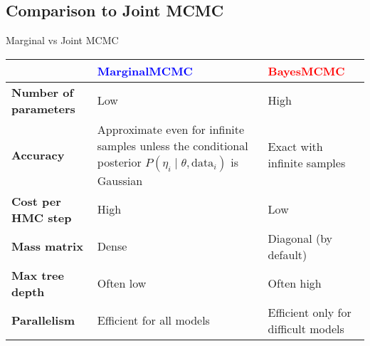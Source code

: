 \subsection{Comparison to Joint MCMC}
\begin{frame}{Marginal vs Joint MCMC}
	\centering
	\small
	\begin{tabular}{|l|p{}|p{}|}
		\toprule
        & \textcolor{blue}{\textbf{MarginalMCMC}} & \textcolor{red}{\textbf{BayesMCMC}} \\ \midrule
		\textbf{Number of parameters} & Low & High \\ \midrule
		\textbf{Accuracy} & Approximate even for infinite samples unless the conditional posterior $P(\eta_i \mid \theta, \text{data}_i)$ is Gaussian & Exact with infinite samples \\ \midrule
		\textbf{Cost per HMC step} & High & Low \\ \midrule
		\textbf{Mass matrix} & Dense & Diagonal (by default) \\ \midrule
		\textbf{Max tree depth} & Often low & Often high \\ \midrule
		\textbf{Parallelism} & Efficient for all models & Efficient only for difficult models \\
		\bottomrule
	\end{tabular}
\end{frame}

